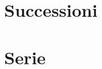 \documentclass[a4paper,12pt]{report} %
\begin{document}
    
    
\chapter{Successioni}
    
    


%

\chapter{Serie}

    
\end{document}
